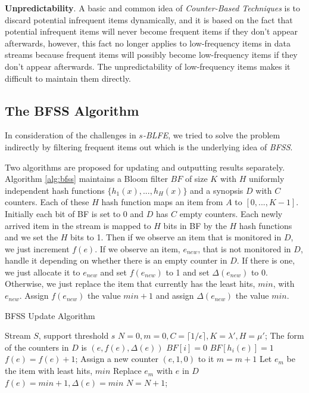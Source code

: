 \documentclass[conference]{IEEEtran}
\begin{document}
\textbf{Unpredictability}. A basic and common idea of \emph{Counter-Based Techniques} is to discard potential infrequent items dynamically, and it is based on the fact that potential infrequent items will never become frequent items if they don't appear afterwards, however, this fact no longer applies to low-frequency items in data streams because frequent items will possibly become low-frequency items if they don't appear afterwards. The unpredictability of low-frequency items makes it difficult to maintain them directly.

\subsection{The BFSS Algorithm}\label{sec:bfss}
In consideration of the challenges in $s$\emph{-BLFE}, we tried to solve the problem indirectly by filtering frequent items out which is the underlying idea of \emph{BFSS}.\par
Two algorithms are proposed for updating and outputting results separately. Algorithm \ref{alg:bfss} maintains a Bloom filter $BF$ of size $K$ with $H$ uniformly independent hash functions $\{h_1(x),...,h_H(x)\}$ and a synopsis $D$ with $C$ counters. Each of these $H$ hash function maps an item from $A$ to $[0,...,K-1]$. Initially each bit of BF is set to 0 and $D$ has $C$ empty counters. Each newly arrived item in the stream is mapped to $H$ bits in BF by the $H$ hash functions and we set the $H$ bits to 1. Then if we observe an item that is monitored in $D$, we just increment $f(e)$. If we observe an item, $e_{new}$, that is not monitored in $D$, handle it depending on whether there is an empty counter in $D$. If there is one, we just allocate it to $e_{new}$ and set $f(e_{new})$ to 1 and set $\Delta(e_{new})$ to 0. Otherwise, we just replace the item that currently has the least hits, $min$, with $e_{new}$. Assign $f(e_{new})$ the value $min+1$ and assign $\Delta(e_{new})$ the value $min$.\par

\begin{algorithm}[h]
	\caption{BFSS Update Algorithm}
	\label{alg:bfss}
\begin{algorithmic}[1]
	\REQUIRE Stream $S$, support threshold $s$
	\STATE $N=0,m=0,C=\lceil 1/\epsilon\rceil,K=\lambda',H=\mu'$; 
	\STATE The form of the counters in $D$ is $(e,f(e),\Delta(e))$
	\STATE $BF[i]=0$
	\ENDFOR
	\STATE $BF[h_i(e)]=1$
	\ENDFOR
	\STATE $f(e)=f(e)+1$;
	\STATE Assign a new counter $(e,1,0)$ to it
	\STATE $m=m+1$
	\ELSE
	\STATE Let $e_m$ be the item with least hits, $min$
	\STATE Replace $e_m$ with $e$ in $D$
	\STATE $f(e)=min+1,\Delta(e)=min$
	\ENDIF
	\STATE $N=N+1$;
	\ENDFOR
\end{algorithmic}
\end{algorithm}
\end{document}
